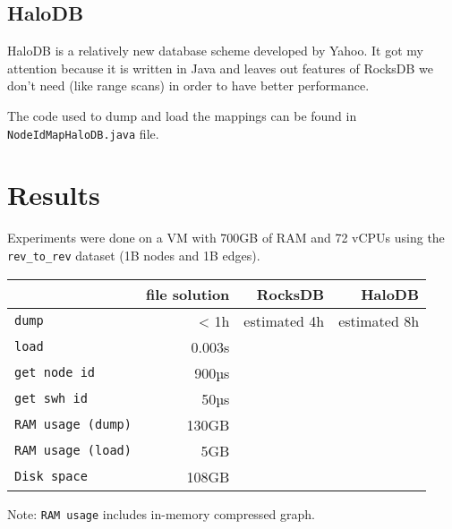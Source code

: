 \documentclass[11pt,a4paper]{article}
\begin{document}
\subsection{HaloDB}

HaloDB is a relatively new database scheme developed by Yahoo. It got my
attention because it is written in Java and leaves out features of RocksDB we
don't need (like range scans) in order to have better performance.

The code used to dump and load the mappings can be found in
\texttt{NodeIdMapHaloDB.java} file.

\section{Results}

Experiments were done on a VM with 700GB of RAM and 72 vCPUs using the
\texttt{rev_to_rev} dataset (1B nodes and 1B edges).

\begin{center}
    \begin{tabular}{@{} l *3r @{}}
        \toprule
        \multicolumn{1}{c}{} &
            \textbf{file solution} & \textbf{RocksDB} &
            \textbf{HaloDB} \\
        \midrule
        \texttt{dump}
            & < 1h & estimated 4h & estimated 8h \\
        \texttt{load}
            & 0.003s & & \\
        \texttt{get node id}
            & ~900µs & & \\
        \texttt{get swh id}
            & ~50µs & & \\
        \texttt{RAM usage (dump)}
            & 130GB & & \\
        \texttt{RAM usage (load)}
            & 5GB & & \\
        \texttt{Disk space}
            & 108GB & & \\
        \bottomrule
    \end{tabular}
\end{center}

Note: \texttt{RAM usage} includes in-memory compressed graph.
\end{document}
